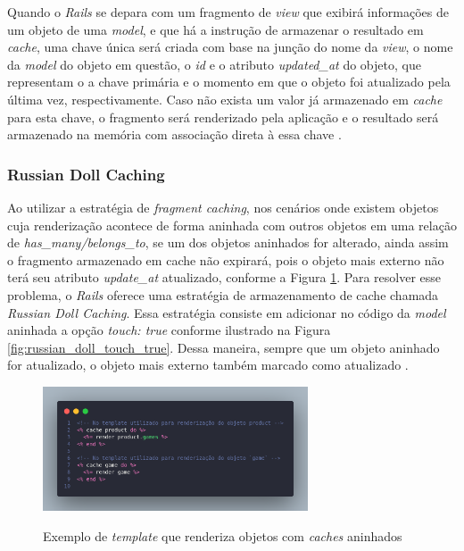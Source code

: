 Quando o \textit{Rails} se depara com um fragmento de \textit{view} que exibirá informações de um objeto de uma \textit{model}, e que há a instrução de armazenar o resultado em \textit{cache}, uma chave única será criada com base na junção do nome da \textit{view}, o nome da \textit{model} do objeto em questão, o \textit{id} e o atributo \textit{updated\_at} do objeto, que representam o a chave primária e o momento em que o objeto foi atualizado pela última vez, respectivamente. Caso não exista um valor já armazenado em \textit{cache} para esta chave, o fragmento será renderizado pela aplicação e o resultado será armazenado na memória com associação direta à essa chave \cite{caching-with-rails-overview}.

\subsubsection{Russian Doll Caching}

Ao utilizar a estratégia de \textit{fragment caching}, nos cenários onde existem objetos cuja renderização acontece de forma aninhada com outros objetos em uma relação de \textit{has\_many/belongs\_to}, se um dos objetos aninhados for alterado, ainda assim o fragmento armazenado em cache não expirará, pois o objeto mais externo não terá seu atributo \textit{update\_at} atualizado, conforme a Figura \ref{fig:russian_doll_template_example}. Para resolver esse problema, o \textit{Rails} oferece uma estratégia de armazenamento de cache chamada \textit{Russian Doll Caching}. Essa estratégia consiste em adicionar no código da \textit{model} aninhada a opção \textit{touch: true} conforme ilustrado na Figura \ref{fig:russian_doll_touch_true}. Dessa maneira, sempre que um objeto aninhado for atualizado, o objeto mais externo também marcado como atualizado \cite{caching-with-rails-overview}.

\begin{figure}
    \centering
    \caption{Exemplo de \textit{template} que renderiza objetos com \textit{caches} aninhados}
    \includegraphics[width=0.7\textwidth]{figuras/russian_doll_template_example.png}
    \label{fig:russian_doll_template_example}
\end{figure}



